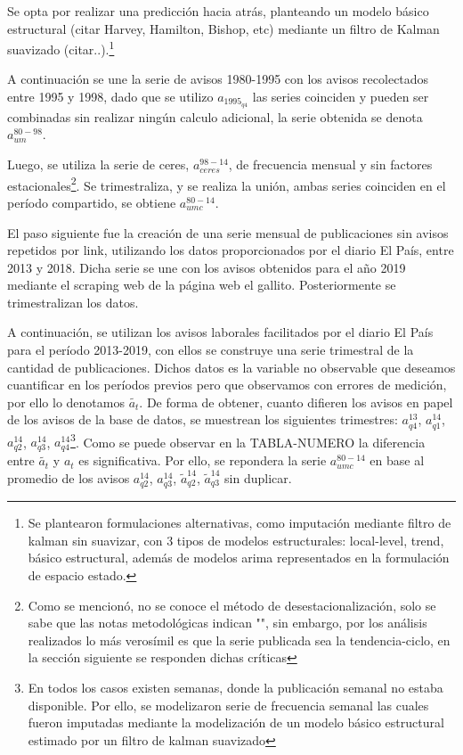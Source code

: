 Se opta por realizar una predicción hacia atrás, planteando un modelo básico estructural (citar Harvey, Hamilton, Bishop, etc) mediante un filtro de Kalman suavizado (citar..).\footnote{Se plantearon formulaciones alternativas, como imputación mediante filtro de kalman sin suavizar, con 3 tipos de modelos estructurales: local-level, trend, básico estructural, además de modelos arima representados en la formulación de espacio estado.}

A continuación se une la serie de avisos 1980-1995 con los avisos recolectados entre 1995 y 1998, dado que se utilizo $a_{1995_{q4}}$ las series coinciden y pueden ser combinadas sin realizar ningún calculo adicional, la serie obtenida se denota $a_{um}^{80-98}$.

Luego, se utiliza la serie de ceres, $a_{ceres}^{98-14}$, de frecuencia mensual y sin factores estacionales\footnote{Como se mencionó, no se conoce el método de desestacionalización, solo se sabe que las notas metodológicas indican "", sin embargo, por los análisis realizados lo más verosímil es que la serie publicada sea la tendencia-ciclo, en la sección siguiente se responden dichas críticas}. Se trimestraliza, y se realiza la unión, ambas series coinciden en el período compartido, se obtiene $a_{umc}^{80-14}$.

El paso siguiente fue la creación de una serie mensual de publicaciones sin avisos repetidos por link, utilizando los datos proporcionados por el diario El País, entre 2013 y 2018. Dicha serie se une con los avisos obtenidos para el año 2019 mediante el scraping web de la página web el gallito. Posteriormente se trimestralizan los datos.

A continuación, se utilizan los avisos laborales facilitados por el diario El País para el período 2013-2019, con ellos se construye una serie trimestral de la cantidad de publicaciones.
Dichos datos es la variable no observable que deseamos cuantificar en los períodos previos pero que observamos con errores de medición, por ello lo denotamos $\tilde{a_t}$. De forma de obtener, cuanto difieren los avisos en papel de los avisos de la base de datos, se muestrean los siguientes trimestres: $a_{q4}^{13}$, $a_{q1}^{14}$, $a_{q2}^{14}$, $a_{q3}^{14}$, $a_{q4}^{14}$\footnote{En todos los casos existen semanas, donde la publicación semanal no estaba disponible. Por ello, se modelizaron serie de frecuencia semanal las cuales fueron imputadas mediante la modelización de un modelo básico estructural estimado por un filtro de kalman suavizado}. Como se puede observar en la TABLA-NUMERO la diferencia entre $\tilde{a_t}$ y ${a_t}$ es significativa. Por ello, se repondera la serie $a_{umc}^{80-14}$ en base al promedio de los avisos $a_{q2}^{14}$, $a_{q3}^{14}$, $\tilde{a}_{q2}^{14}$, $\tilde{a}_{q3}^{14}$ sin duplicar. 

